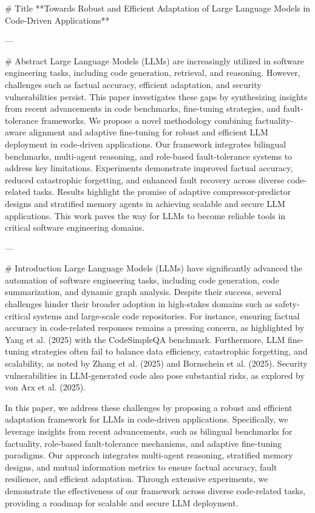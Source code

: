 # Title  
**Towards Robust and Efficient Adaptation of Large Language Models in Code-Driven Applications**

---

# Abstract  
Large Language Models (LLMs) are increasingly utilized in software engineering tasks, including code generation, retrieval, and reasoning. However, challenges such as factual accuracy, efficient adaptation, and security vulnerabilities persist. This paper investigates these gaps by synthesizing insights from recent advancements in code benchmarks, fine-tuning strategies, and fault-tolerance frameworks. We propose a novel methodology combining factuality-aware alignment and adaptive fine-tuning for robust and efficient LLM deployment in code-driven applications. Our framework integrates bilingual benchmarks, multi-agent reasoning, and role-based fault-tolerance systems to address key limitations. Experiments demonstrate improved factual accuracy, reduced catastrophic forgetting, and enhanced fault recovery across diverse code-related tasks. Results highlight the promise of adaptive compressor-predictor designs and stratified memory agents in achieving scalable and secure LLM applications. This work paves the way for LLMs to become reliable tools in critical software engineering domains.

---

# Introduction  
Large Language Models (LLMs) have significantly advanced the automation of software engineering tasks, including code generation, code summarization, and dynamic graph analysis. Despite their success, several challenges hinder their broader adoption in high-stakes domains such as safety-critical systems and large-scale code repositories. For instance, ensuring factual accuracy in code-related responses remains a pressing concern, as highlighted by Yang et al. (2025) with the CodeSimpleQA benchmark. Furthermore, LLM fine-tuning strategies often fail to balance data efficiency, catastrophic forgetting, and scalability, as noted by Zhang et al. (2025) and Bornschein et al. (2025). Security vulnerabilities in LLM-generated code also pose substantial risks, as explored by von Arx et al. (2025).

In this paper, we address these challenges by proposing a robust and efficient adaptation framework for LLMs in code-driven applications. Specifically, we leverage insights from recent advancements, such as bilingual benchmarks for factuality, role-based fault-tolerance mechanisms, and adaptive fine-tuning paradigms. Our approach integrates multi-agent reasoning, stratified memory designs, and mutual information metrics to ensure factual accuracy, fault resilience, and efficient adaptation. Through extensive experiments, we demonstrate the effectiveness of our framework across diverse code-related tasks, providing a roadmap for scalable and secure LLM deployment.

